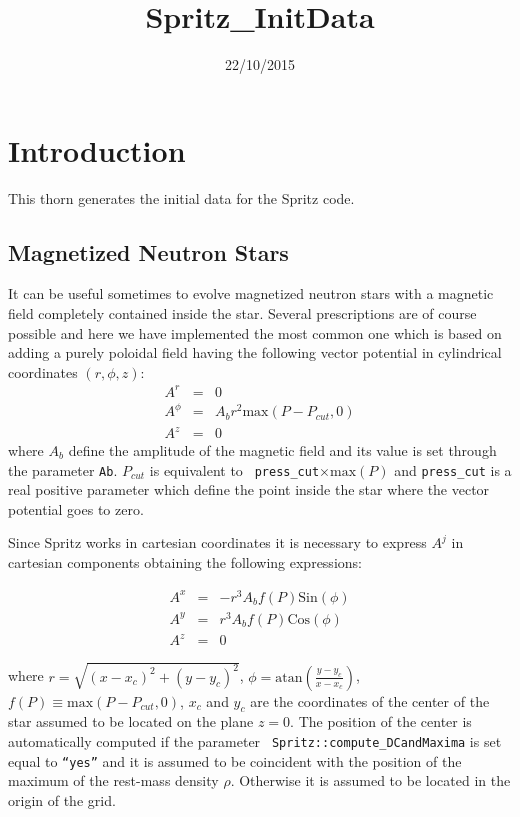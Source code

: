 \documentclass{article}
\begin{document}
\title{Spritz\_InitData}
\date{22/10/2015}
\maketitle


\section{Introduction}
\label{sec:intro}

This thorn generates the initial data for the Spritz code. 





\subsection{Magnetized Neutron Stars}
\label{sec:TOVMHD}

It can be useful sometimes to evolve magnetized neutron stars with a
magnetic field completely contained inside the star. Several
prescriptions are of course possible and here we have implemented the
most common one which is based on adding a purely poloidal field
having the following vector potential in cylindrical coordinates $(r,\phi,z)$:
%
\begin{eqnarray}
  A^r    &=& 0 \\
  A^\phi &=& A_b r^2 \mathrm{max}(P-P_{cut},0) \\
  A^z    &=& 0
\end{eqnarray}
%
where $A_b$ define the amplitude of the magnetic field and its value
is set through the parameter {\tt Ab}. $P_{cut}$ is equivalent to {\tt
press\_cut}$\times \mathrm{max}(P)$ and {\tt press\_cut} is a real
positive parameter which define the point inside the star where the
vector potential goes to zero.

Since Spritz works in cartesian coordinates it is necessary to express
$A^j$ in cartesian components obtaining the following expressions:

\begin{eqnarray}
  A^x &=& -r^3 A_b f(P) \mathrm{Sin}(\phi)\\
  A^y &=&  r^3 A_b f(P) \mathrm{Cos}(\phi)\\
  A^z &=& 0
\end{eqnarray}

where $r=\sqrt{(x-x_c)^2+(y-y_c)^2}$,
$\phi=\mathrm{atan}\left(\frac{y-y_c}{x-x_c}\right)$, $f(P)\equiv
\mathrm{max}(P-P_{cut},0)$, $x_c$ and $y_c$ are the coordinates of the
center of the star assumed to be located on the plane $z=0$. The
position of the center is automatically computed if the parameter {\tt
Spritz::compute\_DCandMaxima} is set equal to {\tt ``yes''} and it is
assumed to be coincident with the position of the maximum of the
rest-mass density $\rho$. Otherwise it is assumed to be located in the
origin of the grid.
\end{document}
